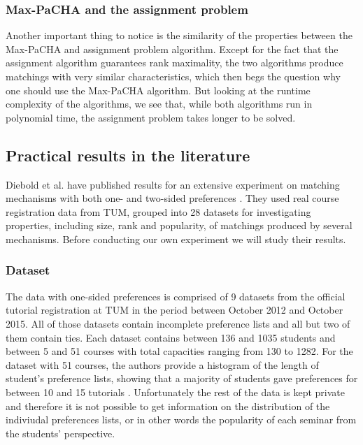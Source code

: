 \subsubsection{Max-PaCHA and the assignment problem}
Another important thing to notice is the similarity of the properties between the Max-PaCHA and assignment problem algorithm. Except for the fact that the assignment algorithm guarantees rank maximality, the two algorithms produce matchings with very similar characteristics, which then begs the question why one should use the Max-PaCHA algorithm. But looking at the runtime complexity of the algorithms, we see that, while both algorithms run in polynomial time, the assignment problem takes longer to be solved.

\subsection{Practical results in the literature}\label{sec:practical-results-lit}
Diebold et al. have published results for an extensive experiment on matching mechanisms with both one- and two-sided preferences \cite{DieboldBenchmark}. They used real course registration data from TUM, grouped into 28 datasets for investigating properties, including size, rank and popularity, of matchings produced by several mechanisms. Before conducting our own experiment we will study their results.

\subsubsection{Dataset}
The data with one-sided preferences is comprised of 9 datasets from the official tutorial registration at TUM in the period between October 2012 and October 2015. All of those datasets contain incomplete preference lists and all but two of them contain ties. Each dataset contains between 136 and 1035 students and between 5 and 51 courses with total capacities ranging from 130 to 1282. For the dataset with 51 courses, the authors provide a histogram of the length of student's preference lists, showing that a majority of students gave preferences for between 10 and 15 tutorials \cite{DieboldBenchmark}. Unfortunately the rest of the data is kept private and therefore it is not possible to get information on the distribution of the indiviudal preferences lists, or in other words the popularity of each seminar from the students' perspective.


